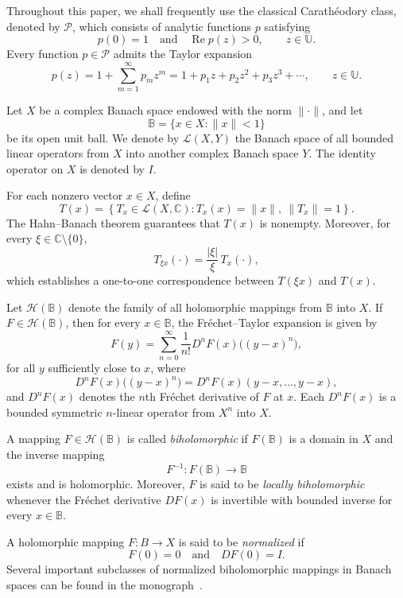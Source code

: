 \documentclass[11pt, reqno]{amsart}
\numberwithin{equation}{section}
\begin{document}
Throughout this paper, we shall frequently use the classical Carath\'eodory class, denoted by $\mathcal{P}$, which consists of analytic functions $p$ satisfying
\[
p(0)=1
\quad\text{and}\quad
\operatorname{Re}p(z)>0,\qquad z\in\mathbb{U}.
\]
Every function $p\in\mathcal{P}$ admits the Taylor expansion
\begin{equation}\label{eq:P}
p(z)=1+\sum_{m=1}^{\infty}p_mz^m
=1+p_1z+p_2z^2+p_3z^3+\cdots,
\qquad z\in\mathbb{U}.
\end{equation}

Let $X$ be a complex Banach space endowed with the norm $\|\cdot\|$, and let
\[
\mathbb{B}=\{x\in X:\|x\|<1\}
\]
be its open unit ball. We denote by $\mathcal{L}(X,Y)$ the Banach space of all bounded linear operators from $X$ into another complex Banach space $Y$. The identity operator on $X$ is denoted by $I$.

For each nonzero vector $x\in X$, define
\[
T(x)=
\left\{
T_x\in\mathcal{L}(X,\mathbb{C}):
T_x(x)=\|x\|,
\ \|T_x\|=1
\right\}.
\]
The Hahn--Banach theorem guarantees that $T(x)$ is nonempty. Moreover, for every $\xi\in\mathbb{C}\setminus\{0\}$,
\[
T_{\xi x}(\cdot)=\frac{|\xi|}{\xi}\,T_x(\cdot),
\]
which establishes a one-to-one correspondence between $T(\xi x)$ and $T(x)$.

Let $\mathcal{H}(\mathbb{B})$ denote the family of all holomorphic mappings from $\mathbb{B}$ into $X$. If $F\in\mathcal{H}(\mathbb{B})$, then for every $x\in \mathbb{B}$, the Fr\'echet--Taylor expansion is given by
\[
F(y)
=
\sum_{n=0}^{\infty}
\frac{1}{n!}
D^nF(x)\bigl((y-x)^n\bigr),
\]
for all $y$ sufficiently close to $x$, where
\[
D^nF(x)\bigl((y-x)^n\bigr)
=
D^nF(x)(y-x,\ldots,y-x),
\]
and $D^nF(x)$ denotes the $n$th Fr\'echet derivative of $F$ at $x$. Each $D^nF(x)$ is a bounded symmetric $n$-linear operator from $X^n$ into $X$.

A mapping $F\in\mathcal{H}(\mathbb{B})$ is called \emph{biholomorphic} if $F(\mathbb{B})$ is a domain in $X$ and the inverse mapping
\[
F^{-1}:F(\mathbb{B})\rightarrow \mathbb{B}
\]
exists and is holomorphic. Moreover, $F$ is said to be \emph{locally biholomorphic} whenever the Fr\'echet derivative $DF(x)$ is invertible with bounded inverse for every $x\in \mathbb{B}$.

A holomorphic mapping $F:B\rightarrow X$ is said to be \emph{normalized} if
\[
F(0)=0
\quad\text{and}\quad
DF(0)=I.
\]
Several important subclasses of normalized biholomorphic mappings in Banach spaces can be found in the monograph~\cite{GK2003}.
\end{document}
